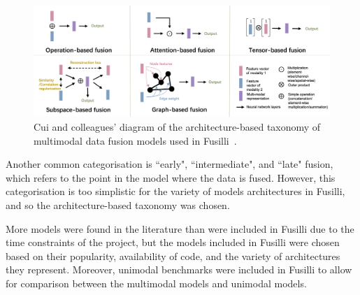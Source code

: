 
\begin{figure}
    \centering
    \includegraphics[width=\textwidth]{figures/cui_diagram}
    \caption{Cui and colleagues' diagram of the architecture-based taxonomy of multimodal data fusion models used in Fusilli~\cite{cuiDeepMultimodalFusion2022}.}
    \label{fig:fusilli_taxonomy}
\end{figure}


Another common categorisation is ``early", ``intermediate", and ``late" fusion, which refers to the point in the model where the data is fused.
However, this categorisation is too simplistic for the variety of models architectures in Fusilli, and so the architecture-based taxonomy was chosen.

More models were found in the literature than were included in Fusilli due to the time constraints of the project, but the models included in Fusilli were chosen based on their popularity, availability of code, and the variety of architectures they represent.
Moreover, unimodal benchmarks were included in Fusilli to allow for comparison between the multimodal models and unimodal models.

